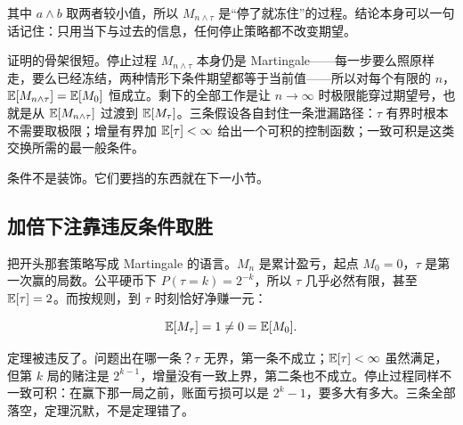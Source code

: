 其中 \(a\wedge b\) 取两者较小值，所以 \(M_{n\wedge\tau}\) 是``停了就冻住''的过程。结论本身可以一句话记住：只用当下与过去的信息，任何停止策略都不改变期望。

证明的骨架很短。停止过程 \(M_{n\wedge\tau}\) 本身仍是 Martingale——每一步要么照原样走，要么已经冻结，两种情形下条件期望都等于当前值——所以对每个有限的 \(n\)，\(\mathbb{E}[M_{n\wedge\tau}]=\mathbb{E}[M_0]\) 恒成立。剩下的全部工作是让 \(n\to\infty\) 时极限能穿过期望号，也就是从 \(\mathbb{E}[M_{n\wedge\tau}]\) 过渡到 \(\mathbb{E}[M_\tau]\)。三条假设各自封住一条泄漏路径：\(\tau\) 有界时根本不需要取极限；增量有界加 \(\mathbb{E}[\tau]<\infty\) 给出一个可积的控制函数；一致可积是这类交换所需的最一般条件。

条件不是装饰。它们要挡的东西就在下一小节。

\subsection{加倍下注靠违反条件取胜}

把开头那套策略写成 Martingale 的语言。\(M_n\) 是累计盈亏，起点 \(M_0=0\)，\(\tau\) 是第一次赢的局数。公平硬币下 \(P(\tau=k)=2^{-k}\)，所以 \(\tau\) 几乎必然有限，甚至 \(\mathbb{E}[\tau]=2\)。而按规则，到 \(\tau\) 时刻恰好净赚一元：

\[
\mathbb{E}[M_\tau]=1\neq0=\mathbb{E}[M_0].
\]

定理被违反了。问题出在哪一条？\(\tau\) 无界，第一条不成立；\(\mathbb{E}[\tau]<\infty\) 虽然满足，但第 \(k\) 局的赌注是 \(2^{k-1}\)，增量没有一致上界，第二条也不成立。停止过程同样不一致可积：在赢下那一局之前，账面亏损可以是 \(2^{k}-1\)，要多大有多大。三条全部落空，定理沉默，不是定理错了。

